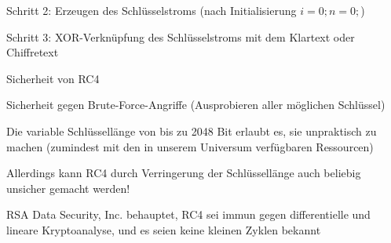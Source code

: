 \documentclass[a4paper]{article}
\begin{document}
\begin{multicols}{3}
\begin{itemize*}
\begin{itemize*}
                  \item Schritt 2: Erzeugen des Schlüsselstroms (nach Initialisierung $i = 0; n = 0;$)
                  \item Schritt 3: XOR-Verknüpfung des Schlüsselstroms mit dem Klartext oder Chiffretext
            \end{itemize*}
            \item Sicherheit von RC4
            \begin{itemize*}
                  \item Sicherheit gegen Brute-Force-Angriffe (Ausprobieren aller möglichen Schlüssel)
                  \item Die variable Schlüssellänge von bis zu 2048 Bit erlaubt es, sie unpraktisch zu machen (zumindest mit den in unserem Universum verfügbaren Ressourcen)
                  \item Allerdings kann RC4 durch Verringerung der Schlüssellänge auch beliebig unsicher gemacht werden!
                  \item RSA Data Security, Inc. behauptet, RC4 sei immun gegen differentielle und lineare Kryptoanalyse, und es seien keine kleinen Zyklen bekannt

\end{itemize*}
\end{itemize*}
\end{multicols}
\end{document}
